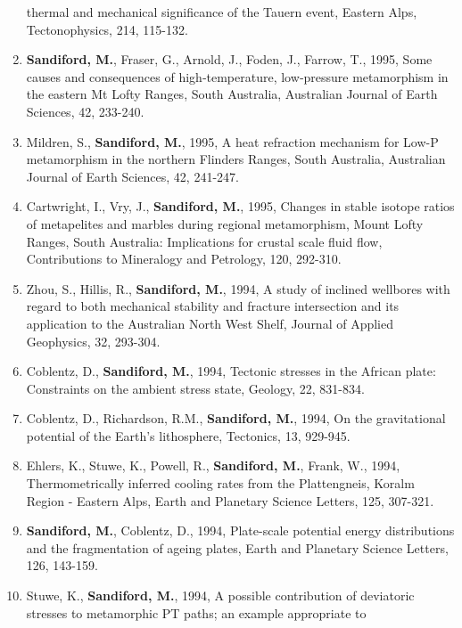 \documentclass[
]{article}
\begin{document}
\begin{enumerate}
  thermal and mechanical significance of the Tauern event, Eastern Alps,
  Tectonophysics, 214, 115-132. 
\item
  \textbf{Sandiford, M.}, Fraser, G., Arnold, J., Foden, J., Farrow, T.,
  1995, Some causes and consequences of high‐temperature, low‐pressure
  metamorphism in the eastern Mt Lofty Ranges, South Australia,
  Australian Journal of Earth Sciences, 42,
  233-240.
\item
  Mildren, S., \textbf{Sandiford, M.}, 1995, A heat refraction mechanism
  for Low-P metamorphism in the northern Flinders Ranges, South
  Australia, Australian Journal of Earth Sciences, 42, 241-247.
\item
  Cartwright, I., Vry, J., \textbf{Sandiford, M.}, 1995, Changes in
  stable isotope ratios of metapelites and marbles during regional
  metamorphism, Mount Lofty Ranges, South Australia: Implications for
  crustal scale fluid flow, Contributions to Mineralogy and Petrology,
  120, 292-310. 
\item
  Zhou, S., Hillis, R., \textbf{Sandiford, M.}, 1994, A study of
  inclined wellbores with regard to both mechanical stability and
  fracture intersection and its application to the Australian North West
  Shelf, Journal of Applied Geophysics, 32,
  293-304.
\item
  Coblentz, D., \textbf{Sandiford, M.}, 1994, Tectonic stresses in the
  African plate: Constraints on the ambient stress state, Geology, 22,
  831-834. 
\item
  Coblentz, D., Richardson, R.M., \textbf{Sandiford, M.}, 1994, On the
  gravitational potential of the Earth's lithosphere, Tectonics, 13,
  929-945. 
\item
  Ehlers, K., Stuwe, K., Powell, R., \textbf{Sandiford, M.}, Frank, W.,
  1994, Thermometrically inferred cooling rates from the Plattengneis,
  Koralm Region - Eastern Alps, Earth and Planetary Science Letters,
  125, 307-321.
\item
  \textbf{Sandiford, M.}, Coblentz, D., 1994, Plate-scale potential
  energy distributions and the fragmentation of ageing plates, Earth and
  Planetary Science Letters, 126, 143-159. 
\item
  Stuwe, K., \textbf{Sandiford, M.}, 1994, A possible contribution of
  deviatoric stresses to metamorphic PT paths; an example appropriate to

\end{enumerate}
\end{document}

